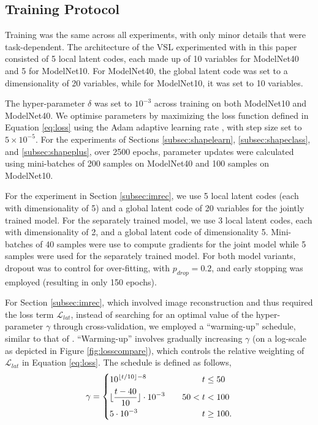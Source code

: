 \documentclass[10pt,twocolumn,letterpaper]{article}
\begin{document}
\subsection{Training Protocol}
\label{subsec:training}
Training was the same across all experiments, with only minor details that were task-dependent.
The architecture of the VSL experimented with in this paper consisted of 5 local latent codes, each made up of 10 variables for ModelNet40 and 5 for ModelNet10. For ModelNet40, the global latent code was set to a dimensionality of 20 variables, while for ModelNet10, it was set to 10 variables.

The hyper-parameter $\delta$ was set to $10^{-3}$ across training on both ModelNet10 and ModelNet40. We optimise parameters by maximizing the loss function defined in Equation \ref{eq:loss} using the Adam adaptive learning rate \cite{kingma2014adam}, with step size set to $5\times 10^{-5}$. For the experiments of Sections \ref{subsec:shapelearn}, \ref{subsec:shapeclass}, and \ref{subsec:shapeplus}, over 2500 epochs, parameter updates were calculated using mini-batches of 200 samples on ModelNet40 and 100 samples on ModelNet10.

For the experiment in Section \ref{subsec:imrec}, we use 5 local latent codes (each with dimensionality of 5) and a global latent code of 20 variables for the jointly trained model. For the separately trained model, we use 3 local latent codes, each with dimensionality of 2, and a global latent code of dimensionality 5. Mini-batches of 40 samples were use to compute gradients for the joint model while 5 samples were used for the separately trained model. For both model variants, dropout \cite{srivastava2014dropout} was to control for over-fitting, with $p_{drop} = 0.2$, and early stopping was employed (resulting in only 150 epochs).

For Section \ref{subsec:imrec}, which involved image reconstruction and thus required the loss term $\mathcal{L}_{lat}$, instead of searching for an optimal value of the hyper-parameter $\gamma$ through cross-validation, we employed a ``warming-up'' schedule, similar to that of \cite{sonderby2016ladder}. ``Warming-up'' involves gradually increasing  $\gamma$ (on a log-scale as depicted in Figure \ref{fig:losscompare}), which controls the relative weighting of $\mathcal{L}_{lat}$ in Equation \ref{eq:loss}. The schedule is defined as follows,
\begin{equation}
\gamma =
\begin{dcases}
10^{\lfloor t/10\rfloor -8}\quad  &\phantom{50<{}}t\leq 50\\
\lfloor\frac{t-40}{10}\rfloor\cdot 10^{-3} \quad & 50<t<100\\
5 \cdot 10^{-3}   \quad &\phantom{50<{}} t\geq 100.
\end{dcases}
\end{equation}
\end{document}
